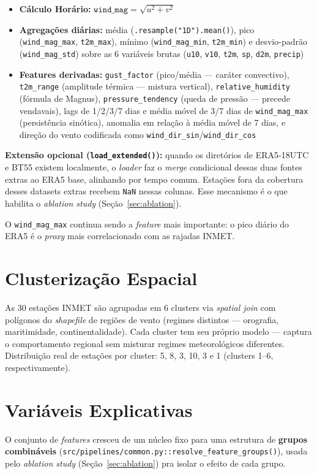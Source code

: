 \documentclass[11pt,a4paper]{article}
\begin{document}
\begin{itemize}
    \item \textbf{Cálculo Horário:} $\texttt{wind\_mag} = \sqrt{u^2 + v^2}$
    \item \textbf{Agregações diárias:} média (\texttt{.resample("1D").mean()}), pico (\texttt{wind\_mag\_max}, \texttt{t2m\_max}), mínimo (\texttt{wind\_mag\_min}, \texttt{t2m\_min}) e desvio-padrão (\texttt{wind\_mag\_std}) sobre as 6 variáveis brutas (\texttt{u10}, \texttt{v10}, \texttt{t2m}, \texttt{sp}, \texttt{d2m}, \texttt{precip})
    \item \textbf{Features derivadas:} \texttt{gust\_factor} (pico/média --- caráter convectivo), \texttt{t2m\_range} (amplitude térmica --- mistura vertical), \texttt{relative\_humidity} (fórmula de Magnus), \texttt{pressure\_tendency} (queda de pressão --- precede vendavais), lags de 1/2/3/7 dias e média móvel de 3/7 dias de \texttt{wind\_mag\_max} (persistência sinótica), anomalia em relação à média móvel de 7 dias, e direção do vento codificada como \texttt{wind\_dir\_sin}/\texttt{wind\_dir\_cos}
\end{itemize}

\noindent \textbf{Extensão opcional (\texttt{load\_extended()}):} quando os diretórios de ERA5-18UTC e BT55 existem localmente, o \textit{loader} faz o \textit{merge} condicional dessas duas fontes extras ao ERA5 base, alinhando por tempo comum. Estações fora da cobertura desses datasets extras recebem \texttt{NaN} nessas colunas. Esse mecanismo é o que habilita o \textit{ablation study} (Seção~\ref{sec:ablation}).

O \texttt{wind\_mag\_max} continua sendo a \textit{feature} mais importante: o pico diário do ERA5 é o \textit{proxy} mais correlacionado com as rajadas INMET.

\section{Clusterização Espacial}
As 30 estações INMET são agrupadas em 6 clusters via \textit{spatial join} com polígonos do \textit{shapefile} de regiões de vento (regimes distintos --- orografia, maritimidade, continentalidade). Cada cluster tem seu próprio modelo --- captura o comportamento regional sem misturar regimes meteorológicos diferentes. Distribuição real de estações por cluster: 5, 8, 3, 10, 3 e 1 (clusters 1--6, respectivamente).

\section{Variáveis Explicativas}
O conjunto de \textit{features} cresceu de um núcleo fixo para uma estrutura de \textbf{grupos combináveis} (\texttt{src/pipelines/common.py::resolve\_feature\_groups()}), usada pelo \textit{ablation study} (Seção~\ref{sec:ablation}) pra isolar o efeito de cada grupo.
\end{document}
